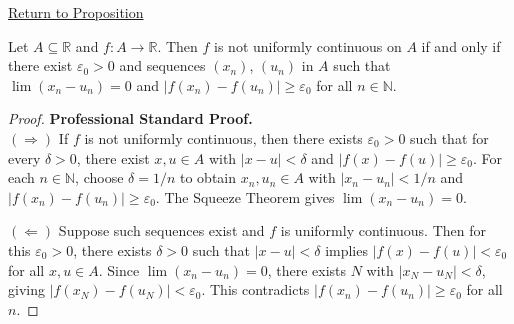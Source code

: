 \newpage
{}
\label{prf:non-uniform-continuity-criteria}

\begin{remark*}[Return]
\hyperref[prop:non-uniform-continuity-criteria]{Return to Proposition}
\end{remark*}

\begin{theorem*}
Let $A \subseteq \mathbb{R}$ and $f : A \to \mathbb{R}$. Then $f$ is not uniformly continuous on $A$ if and only if there exist $\varepsilon_0 > 0$ and sequences $(x_n)$, $(u_n)$ in $A$ such that $\lim(x_n - u_n) = 0$ and $|f(x_n) - f(u_n)| \geq \varepsilon_0$ for all $n \in \mathbb{N}$.
\end{theorem*}

\begin{proof}
\textbf{Professional Standard Proof.}~\\
$(\Rightarrow)$ If $f$ is not uniformly continuous, then there exists $\varepsilon_0 > 0$ such that for every $\delta > 0$, there exist $x, u \in A$ with $|x - u| < \delta$ and $|f(x) - f(u)| \geq \varepsilon_0$. For each $n \in \mathbb{N}$, choose $\delta = 1/n$ to obtain $x_n, u_n \in A$ with $|x_n - u_n| < 1/n$ and $|f(x_n) - f(u_n)| \geq \varepsilon_0$. The Squeeze Theorem gives $\lim(x_n - u_n) = 0$.

$(\Leftarrow)$ Suppose such sequences exist and $f$ is uniformly continuous. Then for this $\varepsilon_0 > 0$, there exists $\delta > 0$ such that $|x - u| < \delta$ implies $|f(x) - f(u)| < \varepsilon_0$ for all $x, u \in A$. Since $\lim(x_n - u_n) = 0$, there exists $N$ with $|x_N - u_N| < \delta$, giving $|f(x_N) - f(u_N)| < \varepsilon_0$. This contradicts $|f(x_n) - f(u_n)| \geq \varepsilon_0$ for all $n$.
\end{proof}


